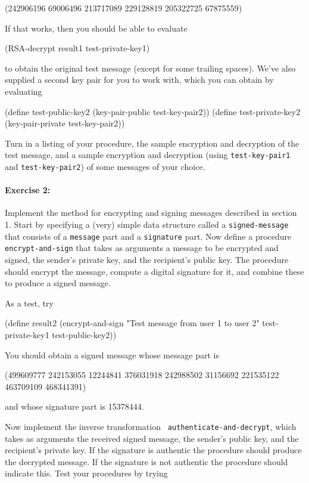 \beginlisp
(242906196 69006496 213717089 229128819 205322725 67875559)
\endlisp

\noindent If that works, then you should be able to evaluate

\beginlisp
(RSA-decrypt result1 test-private-key1)
\endlisp

\noindent
to obtain the original test message (except for some
trailing spaces).  We've also supplied a second key pair for you to
work with, which you can obtain by evaluating

\beginlisp
(define test-public-key2 (key-pair-public test-key-pair2))
(define test-private-key2 (key-pair-private test-key-pair2))
\endlisp

\noindent
Turn in a listing of your procedure, the sample encryption
and decryption of the test message, and a sample encryption and
decryption (using {\tt test-key-pair1} and {\tt test-key-pair2}) of
some messages of your choice.

\paragraph{Exercise 2:}
Implement the method for encrypting and signing messages described in
section 1.  Start by specifying a (very) simple data structure called
a {\tt signed-message} that consists of a {\tt message} part and a
{\tt signature} part.  Now define a procedure {\tt encrypt-and-sign}
that takes as arguments a message to be encrypted and signed, the
sender's private key, and the recipient's public key.  The procedure
should encrypt the message, compute a digital signature for it, and
combine these to produce a signed message.

As a test, try

\beginlisp
(define result2 
  (encrypt-and-sign "Test message from user 1 to user 2"
                    test-private-key1
                    test-public-key2))
\endlisp

\noindent
You should obtain a signed message whose message part is

\beginlisp
(499609777 242153055 12244841 376031918 242988502 31156692 221535122 463709109 468341391)
\endlisp

\noindent
and whose signature part is  15378444.

Now implement the inverse transformation {\tt
authenticate-and-decrypt}, which takes as arguments the received
signed message, the sender's public key, and the recipient's private
key.  If the signature is authentic the procedure should produce the
decrypted message.  If the signature is not authentic the procedure
should indicate this.  Test your procedures by trying

